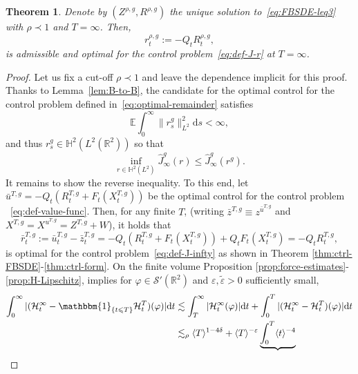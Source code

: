 \documentclass[11pt, a4paper]{scrartcl}
\numberwithin{equation}{section}
\theoremstyle{plain}
\newtheorem{theorem}[foo]{Theorem}
\theoremstyle{remark}
\newcommand{\assign}{:=}
\newcommand{\mathd}{\mathrm{d}}
\begin{document}
\begin{theorem}
	\label{thm:finite-vol-var}Denote by $(Z^{\rho, g}, R^{\rho, g})$ the unique
	solution to~\eqref{eq:FBSDE-leq3} with $\rho \prec 1$ and $T = \infty$. Then,
	\begin{equation}
		r^{\rho, g}_t \assign - Q_t R^{\rho, g}_t \label{eq:optimal-remainder},
	\end{equation}
	is admissible and optimal for the control problem~\eqref{eq:def-J-r} at $T
		= \infty$.
\end{theorem}

\begin{proof}
	Let us fix a cut-off $\rho \prec 1$ and leave the dependence implicit for this
	proof. Thanks to Lemma~\ref{lem:B-to-B}, the candidate for the optimal
	control for the control problem defined in~\eqref{eq:optimal-remainder}
	satisfies
	\[ \mathbb{E} \int_0^{\infty} \| r^g_s \|^2_{L^2} \mathd s < \infty, \]
	and thus $r^g_s \in \mathbb{H}^2 (L^2 (\mathbb{R}^2))$ so that
	\[ \inf_{r \in \mathbb{H}^2 (L^2)}  \hat{J}_{\infty}^g (r) \leqslant
		\hat{J}_{\infty}^g (r^g) . \]
	It remains to show the reverse inequality. To this end, let $\bar{u}^{T, g}
		= - Q_t (R^{T, g}_t + F_t (X^{T, g}_t))$ be the optimal control for the
	control problem ~\eqref{eq:def-value-func}. Then, for any finite $T$,
	(writing $\bar{z}^{T, g} \equiv z^{\bar{u}^{T, g}}$ and $X^{T, g} = X^{u^{T,
						g}} = Z^{T, g} + W$), it holds that
	\[ \bar{r}_t^{T, g} \assign \bar{u}^{T, g}_t - \bar{z}_t^{T, g} = - Q_t (R^{T, g}_t + F_t
		(X^{T, g}_t)) + Q_t F_t (X_t^{T, g}) = - Q_t R_t^{T, g}, \]
	is optimal for the control problem~\eqref{eq:def-J-infty} as shown in
	Theorem \ref{thm:ctrl-FBSDE}-\ref{thm:ctrl-form}. On the finite volume
	Proposition \ref{prop:force-estimates}-\ref{prop:H-Lipschitz}, implies for
	$\varphi \in \mathcal{S}' (\mathbb{R}^2)$ and $\varepsilon,
		\tilde{\varepsilon} > 0$ sufficiently small,
	\[ \begin{aligned}
			\int_0^{\infty} | (\mathcal{H}^{\infty}_t -\mathbbm{1}_{\{ t \leqslant
			T \}} \mathcal{H}^T_t) (\varphi) | \mathd t & \lesssim
			\int_T^{\infty} | \mathcal{H}^{\infty}_t (\varphi) | \mathd t +
			\int_0^T | (\mathcal{H}^{\infty}_t -\mathcal{H}^T_t) (\varphi) | \mathd
			t                                                                                                           \\
			                                            & \lesssim_{\rho}  \langle T \rangle^{1 - 4 \delta} + \langle T
			\rangle^{- \varepsilon} \underbrace{\int_0^T \langle t \rangle^{- 4
}}
\end{aligned}\]
\end{proof}
\end{document}
